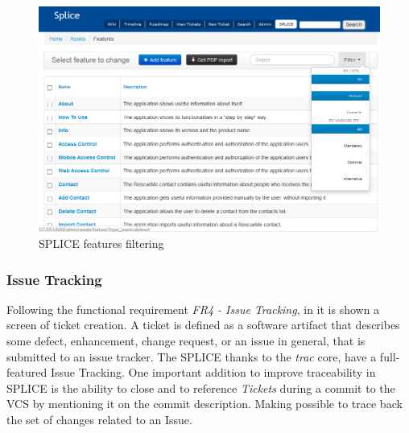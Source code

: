 \begin{figure}[htp]
\begin{center}
  \includegraphics[width=14cm]{chapters/proposed_solution/img/captures/View-features.PNG}
  \caption[SPLICE feature filtering]{SPLICE features filtering }
  \label{fg:splice-feature-filtering}
\end{center}
\end{figure}

\subsubsection{Issue Tracking}

Following the functional requirement \textit{FR4 - Issue Tracking}, in  it is shown a screen of ticket creation.  A ticket is defined as a software artifact that describes some defect, enhancement, change request, or an issue in general, that is submitted to an issue tracker. The \ac{SPLICE} thanks to the \textit{trac} core, have a full-featured Issue Tracking. One important addition to improve traceability in \ac{SPLICE} is the ability to close and to reference \textit{Tickets} during a commit to the \ac{VCS} by mentioning it on the commit description. Making possible to trace back the set of changes related to an Issue.

